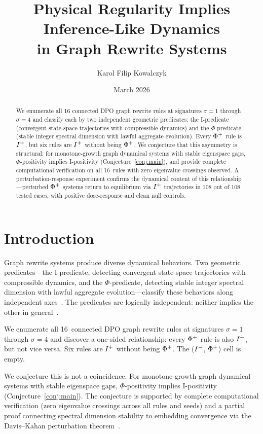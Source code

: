 \documentclass{../shared/primo}
\title{Physical Regularity Implies Inference-Like Dynamics\\in Graph Rewrite Systems}
\author{Karol Filip Kowalczyk}
\affiliation{AIRON Games}
\date{March 2026}
\begin{document}
\maketitle

\begin{abstract}
We enumerate all 16 connected DPO graph rewrite rules at signatures $\sigma = 1$ through $\sigma = 4$ and classify each by two independent geometric predicates: the I-predicate (convergent state-space trajectories with compressible dynamics) and the $\Phi$-predicate (stable integer spectral dimension with lawful aggregate evolution). Every $\Phi\textsuperscript{+}$ rule is $I\textsuperscript{+}$, but six rules are $I\textsuperscript{+}$ without being $\Phi\textsuperscript{+}$. We conjecture that this asymmetry is structural: for monotone-growth graph dynamical systems with stable eigenspace gaps, $\Phi$-positivity implies I-positivity (Conjecture~\ref{conj:main}), and provide complete computational verification on all 16~rules with zero eigenvalue crossings observed. A perturbation-response experiment confirms the dynamical content of this relationship---perturbed $\Phi\textsuperscript{+}$ systems return to equilibrium via $I\textsuperscript{+}$ trajectories in 108 out of 108 tested cases, with positive dose-response and clean null controls.
\end{abstract}


\section{Introduction}
\label{sec:intro}

Graph rewrite systems produce diverse dynamical behaviors. Two geometric predicates---the I-predicate, detecting convergent state-space trajectories with compressible dynamics, and the $\Phi$-predicate, detecting stable integer spectral dimension with lawful aggregate evolution---classify these behaviors along independent axes~\cite{kowalczyk2026predicates}. The predicates are logically independent: neither implies the other in general~\cite[Theorem~1]{kowalczyk2026predicates}.

We enumerate all 16~connected DPO graph rewrite rules at signatures $\sigma = 1$ through $\sigma = 4$ and discover a one-sided relationship: every $\Phi\textsuperscript{+}$ rule is also $I\textsuperscript{+}$, but not vice versa. Six rules are $I\textsuperscript{+}$ without being $\Phi\textsuperscript{+}$. The ($I\textsuperscript{$-$}$, $\Phi\textsuperscript{+}$) cell is empty.

We conjecture this is not a coincidence. For monotone-growth graph dynamical systems with stable eigenspace gaps, $\Phi$-positivity implies I-positivity (Conjecture~\ref{conj:main}). The conjecture is supported by complete computational verification (zero eigenvalue crossings across all rules and seeds) and a partial proof connecting spectral dimension stability to embedding convergence via the Davis--Kahan perturbation theorem~\cite{davis1970rotation}.
\end{document}
